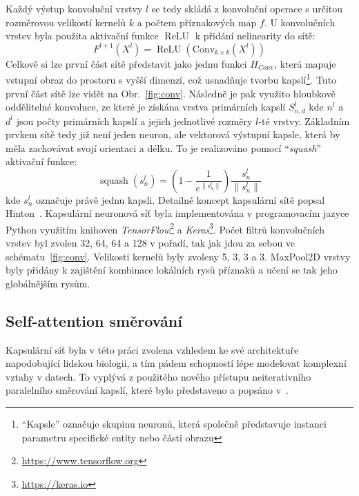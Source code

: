 Každý výstup konvoluční vrstvy $l$ se tedy skládá z konvoluční operace s určitou
rozměrovou velikostí kernelů $k$ a počtem příznakových map $f$. U konvolučních
vrstev byla použita aktivační funkce $\operatorname{ReLU}$ k přidání nelinearity
do sítě:
\begin{equation}
    F^{l+1}\left(X^l\right)=\operatorname{ReLU}\left(\text {Conv}_{k \times k}\left(X^l\right)\right)
\end{equation}
Celkově si lze první část sítě představit jako jednu funkci $H_{Conv}$, která
mapuje vstupní obraz do prostoru s vyšší dimenzí, což usnadňuje tvorbu
kapslí\footnote{\enquote{Kapsle} označuje skupinu neuronů, která společně
představuje instanci parametru specifické entity nebo části obrazu}. Tuto první
část sítě lze vidět na Obr.~\ref{fig:conv}. Následně je pak využito hloubkově
oddělitelné konvoluce, ze které je získána vrstva primárních kapslí $S_{n,d}^l$
kde $n^l$ a $d^l$ jsou počty primárních kapslí a jejich jednotlivé rozměry
$l$-té vrstvy. Základním prvkem sítě tedy již není jeden neuron, ale vektorová
výstupní kapsle, která by měla zachovávat svojí orientaci a délku. To je
realizováno pomocí \enquote{\textit{squash}} aktivační funkce:
\begin{equation}
    \operatorname{squash}\left(s_n^l\right)=\left(1-\frac{1}{e^{\left\|s_n^l\right\|}}\right) \frac{s_n^l}{\left\|s_n^l\right\|}
\end{equation}
kde $s_n^l$ označuje právě jednu kapsli. Detailně koncept kapsulární sítě popsal
Hinton~\cite{Hinton2011}. Kapsulární neuronová síť byla implementována v
programovacím jazyce Python využitím knihoven
\textit{TensorFlow}\footnote{\url{https://www.tensorflow.org}} a
\textit{Keras}\footnote{\url{https://keras.io}}. Počet filtrů konvolučních
vrstev byl zvolen 32, 64, 64 a 128 v pořadí, tak jak jdou za sebou ve
schématu~\ref{fig:conv}. Velikosti kernelů byly zvoleny 5, 3, 3 a 3. MaxPool2D
vrstvy byly přidány k zajištění kombinace lokálních rysů příznaků a učení se tak
jeho globálnějším rysům. 

\subsection{Self-attention směrování}
\label{subsec:dynamicke_smerovani}
Kapsulární síť byla v této práci zvolena vzhledem ke své architektuře
napodobující lidskou biologii, a tím pádem schopností lépe modelovat komplexní
vztahy v datech. To vyplývá z použitého nového přístupu neiterativního
paralelního směrování kapslí, které bylo představeno a popsáno
v~\cite{Mazzia2021}.

